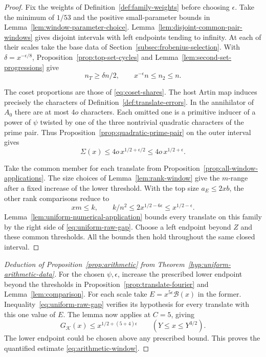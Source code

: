 \begin{proof}
Fix the weights of Definition~\ref{def:family-weights} before choosing
\(\epsilon\). Take the minimum of \(1/53\) and the positive
small-parameter bounds in Lemma~\ref{lem:window-parameter-choice}.
Lemma~\ref{lem:disjoint-common-pair-windows} gives disjoint intervals
with left endpoints tending to infinity. At each of their scales
take the base data of Section~\ref{subsec:frobenius-selection}.
With \(\delta=x^{-\epsilon/8}\), Proposition~\ref{prop:top-set-cycles}
and Lemma~\ref{lem:second-set-progressions} give
\[
 n_T\ge\delta n/2,\qquad x^{-\epsilon}n\le n_2\le n .
\]

The coset proportions are those of \eqref{eq:coset-shares}.
The host Artin map induces precisely the characters of
Definition~\ref{def:translate-errors}. In the annihilator of
\(A_0\) there are at most \(4o\) characters. Each omitted one is
a primitive inducer of a power of \(\psi\) twisted by one of the
three nontrivial quadratic characters of the prime pair. Thus
Proposition~\ref{prop:quadratic-prime-pair} on the outer interval gives
\[
 \Sigma(x)\le4o\,x^{1/2+\epsilon/2}\le4o\,x^{1/2+\epsilon}.
\]

Take the common member for each translate from
Proposition~\ref{prop:all-window-applications}. The size choices
of Lemma~\ref{lem:rank-window} give the \(m\)-range after a fixed
increase of the lower threshold. With the top size \(a_E\le2xb\),
the other rank comparisons reduce to
\[
   xm\le k,\qquad k/n^2\le2x^{1/2-6\epsilon}
                           \le x^{1/2-\epsilon}.
\]
Lemma~\ref{lem:uniform-numerical-application} bounds every translate
on this family by the right side of \eqref{eq:uniform-raw-gap}.
Choose a left endpoint beyond \(Z\) and these common thresholds.
All the bounds then hold throughout the same closed interval.
\end{proof}

\begin{proof}[Deduction of Proposition~\ref{prop:arithmetic} from Theorem~\ref{hyp:uniform-arithmetic-data}]
For the chosen \(\psi,\epsilon\), increase the prescribed lower endpoint beyond the thresholds in Proposition~\ref{prop:translate-fourier} and Lemma~\ref{lem:comparison}. For each scale take \(E=x^{5\epsilon}\mathcal B(x)\) in the former. Inequality~\eqref{eq:uniform-raw-gap} verifies its hypothesis for every translate with this one value of \(E\). The lemma now applies at \(C=5\), giving
\[
   G_{\mathcal K}(x)\le x^{1/2+(5+4)\epsilon}
           \qquad(Y\le x\le Y^{3/2}).
\]
The lower endpoint could be chosen above any prescribed bound. This proves the quantified estimate \eqref{eq:arithmetic-window}.
\end{proof}

